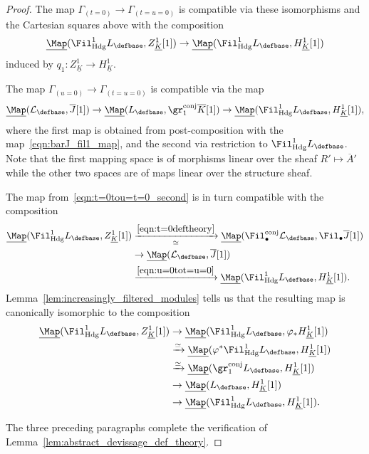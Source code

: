 \documentclass[10pt]{amsart}
\begin{document}
\begin{proof}
The map $\Gamma_{(t=0)}\to \Gamma_{(t=u=0)}$ is compatible via these isomorphisms and the Cartesian squares above with the composition
\begin{align*}
\underline{\Map}(\Fil^1_{\mathrm{Hdg}}L_\defbase,Z^1_{\underline{K}}[1])\to \underline{\Map}(\Fil^1_{\mathrm{Hdg}}L_\defbase,H^1_{\underline{K}}[1])
\end{align*}
induced by $q_1:Z^1_{\underline{K}}\to H^1_{\underline{K}}$. 


The map $\Gamma_{(u=0)}\to \Gamma_{(t=u=0)}$ is compatible via the map
\begin{align}\label{eqn:u=0tot=u=0}
\underline{\Map}(\mathcal{L}_\defbase,\overline{J}[1])\to \underline{\Map}(L_\defbase,\gr_1^{\mathrm{conj}}\overline{K}[1])\to  \underline{\Map}(\Fil^1_{\mathrm{Hdg}}L_\defbase,H^1_{\underline{K}}[1]),
\end{align}
where the first map is obtained from post-composition with the map~\eqref{eqn:barJ_fil1_map}, and the second via restriction to $\Fil^1_{\mathrm{Hdg}}L_\defbase$. Note that the first mapping space is of morphisms linear over the sheaf $R'\mapsto \overline{A}'$ while the other two spaces are of maps linear over the structure sheaf.

The map from~\eqref{eqn:t=0tou=t=0_second} is in turn compatible with the composition
\begin{align*}
\underline{\Map}(\Fil^1_{\mathrm{Hdg}}L_\defbase,Z^1_{\underline{K}}[1])&\xrightarrow[\simeq]{\eqref{eqn:t=0deftheory}}\underline{\Map}(\Fil^{\mathrm{conj}}_\bullet \mathcal{L}_\defbase,\Fil_\bullet \overline{J}[1])\\
&\to \underline{\Map}(\mathcal{L}_\defbase, \overline{J}[1])\\
&\xrightarrow{\eqref{eqn:u=0tot=u=0}}\underline{\Map}(\Fil^1_{\mathrm{Hdg}}L_\defbase,H^1_{\underline{K}}[1]).
\end{align*}
Lemma~\ref{lem:increasingly_filtered_modules} tells us that the resulting map is canonically isomorphic to the composition
\begin{align*}
\underline{\Map}(\Fil^1_{\mathrm{Hdg}}L_\defbase,Z^1_{\underline{K}}[1])&\to \underline{\Map}(\Fil^1_{\mathrm{Hdg}}L_\defbase,\varphi_*H^1_{\underline{K}}[1])\\
&\xrightarrow{\simeq} \underline{\Map}(\varphi^*\Fil^1_{\mathrm{Hdg}}L_\defbase,H^1_{\underline{K}}[1])\\
&\xrightarrow{\simeq}\underline{\Map}(\gr^{\mathrm{conj}}_1L_\defbase,H^1_{\underline{K}}[1])\\
&\to\underline{\Map}(L_\defbase,H^1_{\underline{K}}[1])\\
&\to\underline{\Map}(\Fil^1_{\mathrm{Hdg}}L_\defbase,H^1_{\underline{K}}[1]).
\end{align*}

The three preceding paragraphs complete the verification of Lemma~\ref{lem:abstract_devissage_def_theory}.
\end{proof}
\end{document}
